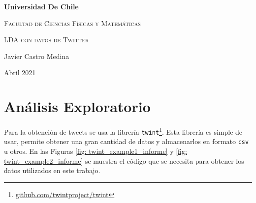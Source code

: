 \documentclass{article}
\begin{document}


\begin{titlepage}
	\centering
	{\bfseries\LARGE Universidad De Chile \par}
	\vspace{1cm}
	{\scshape\Large Facultad de Ciencias Físicas y Matemáticas \par}
	\vspace{3cm}
	{\scshape\Huge LDA con datos de Twitter \par}
	\vfill
	{\Large  Javier Castro Medina\par}

	\vfill
	{\Large Abril 2021 \par}
\end{titlepage}
\newpage

\section{Análisis Exploratorio}
Para la obtención de tweets se usa la librería \texttt{twint}\footnote{\href{https://github.com/twintproject/twint}{github.com/twintproject/twint}}. Esta librería es simple de usar, permite obtener una gran cantidad de datos y almacenarlos en formato \texttt{csv} u otros. En las Figuras \ref{fig: twint_example1_informe} y \ref{fig: twint_example2_informe} se muestra el código que se necesita para obtener los datos utilizados en este trabajo.    
\end{document}
